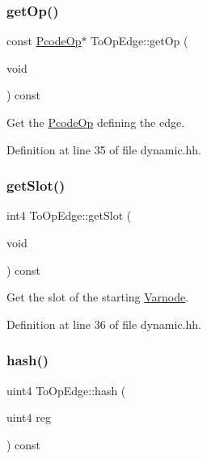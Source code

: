 \subsubsection{\texorpdfstring{getOp()}{getOp()}}
{\footnotesize\ttfamily const \mbox{\hyperlink{class_pcode_op}{Pcode\+Op}}$\ast$ To\+Op\+Edge\+::get\+Op (\begin{DoxyParamCaption}\item[{void}]{ }\end{DoxyParamCaption}) const\hspace{0.3cm}{\ttfamily [inline]}}



Get the \mbox{\hyperlink{class_pcode_op}{Pcode\+Op}} defining the edge. 



Definition at line 35 of file dynamic.\+hh.

\mbox{\label{class_to_op_edge_a4b09f46810c4a09f45fea92bc23d6841}} 
\subsubsection{\texorpdfstring{getSlot()}{getSlot()}}
{\footnotesize\ttfamily int4 To\+Op\+Edge\+::get\+Slot (\begin{DoxyParamCaption}\item[{void}]{ }\end{DoxyParamCaption}) const\hspace{0.3cm}{\ttfamily [inline]}}



Get the slot of the starting \mbox{\hyperlink{class_varnode}{Varnode}}. 



Definition at line 36 of file dynamic.\+hh.

\mbox{\label{class_to_op_edge_a1a18d58e3a6b8686df271cf7911e35a2}} 
\subsubsection{\texorpdfstring{hash()}{hash()}}
{\footnotesize\ttfamily uint4 To\+Op\+Edge\+::hash (\begin{DoxyParamCaption}\item[{uint4}]{reg }\end{DoxyParamCaption}) const}



